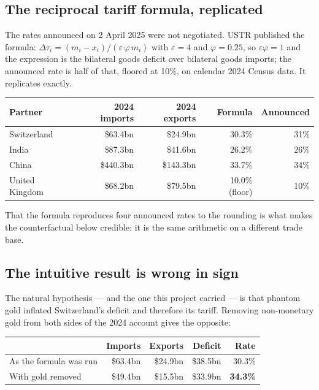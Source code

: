 \documentclass[11pt,a4paper]{article}
\begin{document}
\subsection{The reciprocal tariff formula, replicated}

The rates announced on 2 April 2025 were not negotiated. USTR published the formula:
$\Delta\tau_i = (m_i - x_i)/(\varepsilon\,\varphi\,m_i)$ with $\varepsilon = 4$ and
$\varphi = 0.25$, so $\varepsilon\varphi = 1$ and the expression is the bilateral goods deficit
over bilateral goods imports; the announced rate is half of that, floored at 10\%, on calendar
2024 Census data. It replicates exactly.

\begin{center}
\small
\begin{tabular}{@{}lrrrr@{}}
\toprule
\textbf{Partner} & \textbf{2024 imports} & \textbf{2024 exports} & \textbf{Formula} & \textbf{Announced} \\
\midrule
Switzerland & \$63.4bn & \$24.9bn & 30.3\% & 31\% \\
India & \$87.3bn & \$41.6bn & 26.2\% & 26\% \\
China & \$440.3bn & \$143.3bn & 33.7\% & 34\% \\
United Kingdom & \$68.2bn & \$79.5bn & 10.0\% (floor) & 10\% \\
\bottomrule
\end{tabular}
\end{center}

That the formula reproduces four announced rates to the rounding is what makes the
counterfactual below credible: it is the same arithmetic on a different trade base.

\subsection{The intuitive result is wrong in sign}

The natural hypothesis --- and the one this project carried --- is that phantom gold inflated
Switzerland's deficit and therefore its tariff. Removing non-monetary gold from both sides of
the 2024 account gives the opposite:

\begin{center}
\small
\begin{tabular}{@{}lrrrr@{}}
\toprule
& \textbf{Imports} & \textbf{Exports} & \textbf{Deficit} & \textbf{Rate} \\
\midrule
As the formula was run & \$63.4bn & \$24.9bn & \$38.5bn & 30.3\% \\
With gold removed & \$49.4bn & \$15.5bn & \$33.9bn & \textbf{34.3\%} \\
\bottomrule
\end{tabular}
\end{center}
\end{document}
